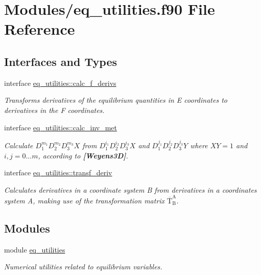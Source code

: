 \hypertarget{eq__utilities_8f90}{}\section{Modules/eq\+\_\+utilities.f90 File Reference}
\label{eq__utilities_8f90}
\subsection*{Interfaces and Types}
\begin{DoxyCompactItemize}
\item 
interface \hyperlink{interfaceeq__utilities_1_1calc__f__derivs}{eq\+\_\+utilities\+::calc\+\_\+f\+\_\+derivs}
\begin{DoxyCompactList}\small\item\em Transforms derivatives of the equilibrium quantities in E coordinates to derivatives in the F coordinates. \end{DoxyCompactList}\item 
interface \hyperlink{interfaceeq__utilities_1_1calc__inv__met}{eq\+\_\+utilities\+::calc\+\_\+inv\+\_\+met}
\begin{DoxyCompactList}\small\item\em Calculate $D_1^{m_1} D_2^{m_2} D_3^{m_3} X$ from $D_1^{i_1} D_2^{i_2} D_3^{i_3} X$ and $D_1^{j_1} D_2^{j_2} D_3^{j_3} Y$ where $XY=1$ and $i,j = 0\ldots m$, according to {\bfseries [Weyens3D]}. \end{DoxyCompactList}\item 
interface \hyperlink{interfaceeq__utilities_1_1transf__deriv}{eq\+\_\+utilities\+::transf\+\_\+deriv}
\begin{DoxyCompactList}\small\item\em Calculates derivatives in a coordinate system B from derivatives in a coordinates system A, making use of the transformation matrix $\overline{\text{T}}_\text{B}^\text{A}$. \end{DoxyCompactList}\end{DoxyCompactItemize}
\subsection*{Modules}
\begin{DoxyCompactItemize}
\item 
module \hyperlink{namespaceeq__utilities}{eq\+\_\+utilities}
\begin{DoxyCompactList}\small\item\em Numerical utilities related to equilibrium variables. \end{DoxyCompactList}\end{DoxyCompactItemize}
